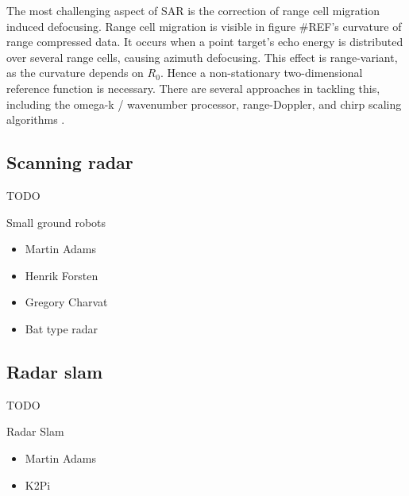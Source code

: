The most challenging aspect of SAR is the correction of range cell
migration induced defocusing. Range cell migration is visible in figure
\#REF's curvature of range compressed data. It occurs when a point
target's echo energy is distributed over several range cells, causing
azimuth defocusing. This effect is range-variant, as the curvature
depends on \(R_0\). Hence a non-stationary two-dimensional reference
function is necessary. There are several approaches in tackling this,
including the omega-k / wavenumber processor, range-Doppler, and chirp
scaling algorithms \cite{Moreira2013}.

\subsection{Scanning radar}\label{scanning-radar}

TODO

Small ground robots

\begin{itemize}
\item
  Martin Adams
\item
  Henrik Forsten
\item
  Gregory Charvat
\item
  Bat type radar
\end{itemize}

\subsection{Radar slam}\label{radar-slam}

TODO

Radar Slam

\begin{itemize}
\item
  Martin Adams
\item
  K2Pi
\end{itemize}

